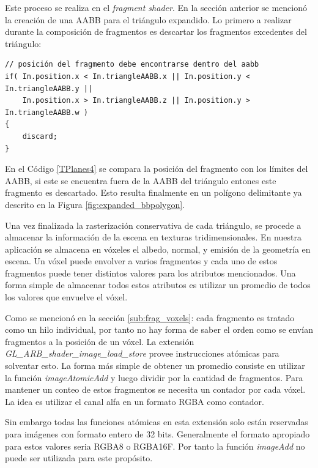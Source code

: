 Este proceso se realiza en el \emph{fragment shader}. En la sección anterior se mencionó la creación de una \ac{AABB} para el triángulo expandido. Lo primero a realizar durante la composición de fragmentos es descartar los fragmentos excedentes del triángulo:
\\
\begin{lstlisting}[caption={Descarte de fragmentos excedentes en el \emph{fragment shader}.}, label=TPlanes4]
// posición del fragmento debe encontrarse dentro del aabb
if( In.position.x < In.triangleAABB.x || In.position.y < In.triangleAABB.y || 
	In.position.x > In.triangleAABB.z || In.position.y > In.triangleAABB.w )
{
	discard;
}
\end{lstlisting}

En el Código \ref{TPlanes4} se compara la posición del fragmento con los límites del \ac{AABB}, si este se encuentra fuera de la \ac{AABB} del triángulo entones este fragmento es descartado. Esto resulta finalmente en un polígono delimitante ya descrito en la Figura \ref{fig:expanded_bbpolygon}.

Una vez finalizada la rasterización conservativa de cada triángulo, se procede a almacenar la información de la escena en texturas tridimensionales. En nuestra aplicación se almacena en vóxeles el albedo, normal, y emisión de la geometría en escena. Un vóxel puede envolver a varios fragmentos y cada uno de estos fragmentos puede tener distintos valores para los atributos mencionados. Una forma simple de almacenar todos estos atributos es utilizar un promedio de todos los valores que envuelve el vóxel. 

Como se mencionó en la sección \ref{sub:frag_voxels}: cada fragmento es tratado como un hilo individual, por tanto no hay forma de saber el orden como se envían fragmentos a la posición de un vóxel. La extensión \emph{GL\_ARB\_shader\_image\_load\_store} provee instrucciones atómicas para solventar esto. La forma más simple de obtener un promedio consiste en utilizar la función \emph{imageAtomicAdd} y luego dividir por la cantidad de fragmentos. Para mantener un conteo de estos fragmentos se necesita un contador por cada vóxel. La idea es utilizar el canal alfa en un formato RGBA como contador. 

Sin embargo todas las funciones atómicas en esta extensión solo están reservadas para imágenes con formato entero de 32 bits. Generalmente el formato apropiado para estos valores seria RGBA8 o RGBA16F. Por tanto la función \emph{imageAdd} no puede ser utilizada para este propósito.

